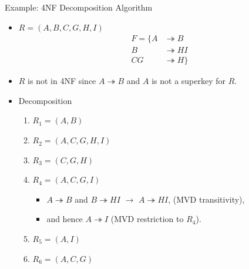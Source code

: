 \documentclass{beamer}
\begin{document}
\begin{frame}{Example: 4NF Decomposition Algorithm}
    \footnotesize
    \begin{itemize}
        \item $R =(A, B, C, G, H, I)$ \\
            \begin{equation*}
                \begin{align*}
                    F = \{  A  &\twoheadrightarrow B  \\
                            B  &\twoheadrightarrow HI \\
                            CG &\twoheadrightarrow H \}
                \end{align*}
            \end{equation*}

        \item $R$ is not in 4NF since $A \twoheadrightarrow B$ and $A$ is not a superkey for $R$.

        \item Decomposition
            \begin{enumerate}
                \item $R_1 = (A, B)$            \quad [$R_1$ is in 4NF] \pause
                \item $R_2 = (A, C, G, H, I)$    \pause
                \item $R_3 = (C, G, H)$         \quad [$R_3$ is in 4NF] \pause
                \item $R_4 = (A, C, G, I)$       \pause
                    \begin{itemize}
                        \item $A \twoheadrightarrow B$ and $B \twoheadrightarrow HI$ $\longrightarrow$ $A \twoheadrightarrow HI$, (MVD transitivity),
                        \item and hence $A \twoheadrightarrow I$ (MVD restriction to $R_4$). \pause
                    \end{itemize}
                \item $R_5 = (A, I)$            \quad [$R_5$ is in 4NF] \pause
                \item $R_6 = (A, C, G)$         \quad [$R_6$ is in 4NF]
            \end{enumerate}
    \end{itemize}
\end{frame}
\end{document}
